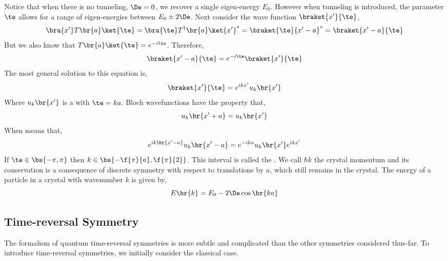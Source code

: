\documentclass{article}
\begin{document}
\begin{center}
\end{center}
Notice that when there is no tunneling, $\De = 0$, we recover a single eigen-energy $E_0$. However when tunneling is introduced, the parameter $\te$ allows for a range of eigen-energies between $E_0 \pm 2 \De$. Next consider the wave function $\braket{x'}{\te}$,
\[ \bra{x'} T\br{a} \ket{\te} = \bra{\te} T^{\dagger}\br{a} \ket{x'}^* = \braket{\te}{x' - a}^* = \braket{x' - a}{\te} \]
But we also know that $T\br{a} \ket{\te} = e^{-i \te}$. Therefore,
\[ \braket{x' - a}{\te} = e^{-i\te}\braket{x'}{\te} \]
The most general solution to this equation is,
\[ \braket{x'}{\te} = e^{i k x'} u_k \br{x'} \]
Where $u_k \br{x'}$ is a  with $\te = k a$. Bloch wavefunctions have the property that,
\[ u_k \br{x'+a} = u_k\br{x'} \]
When means that,
\[ e^{ik\br{x' -a}} u_k\br{x'-a} = e^{- i k a} u_k\br{x'} e^{i k x'} \]
If $\te \in \bs{-\pi, \pi}$ then $k \in \bs{-\f{\pi}{a}, \f{\pi}{2}}$. This interval is called the . We call $\hbar k$ the crystal momentum and its conservation is a consequence of discrete symmetry with respect to translations by $a$, which still remains in the crystal. The energy of a particle in a crystal with wavenumber $k$ is given by,
\[ E\br{k} = E_0 - 2 \De \cos \br{k a} \]
\subsection{Time-reversal Symmetry}
The formalism of quantum time-reversal symmetries is more subtle and complicated than the other symmetries considered thus-far. To introduce time-reversal symmetries, we initially consider the classical case.
\begin{center}
\end{center}
\end{document}
